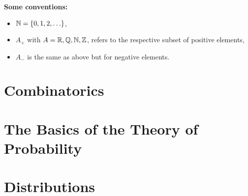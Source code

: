 \documentclass[12pt]{article}
\begin{document}
\maketitle
\tableofcontents
\newpage
\textbf{Some conventions:} 
\begin{itemize}
    \item $\mathbb{N} = \{0,1,2, \ldots \}$,
    \item $A_+$ with $A = \mathbb{R}, \mathbb{Q}, \mathbb{N}, \mathbb{Z}$, refers to the respective subset of positive elements,
    \item $A_-$ is the same as above but for negative elements. 
\end{itemize}
\section{Combinatorics}

\section{The Basics of the Theory of Probability}

\section{Distributions}

\end{document}
